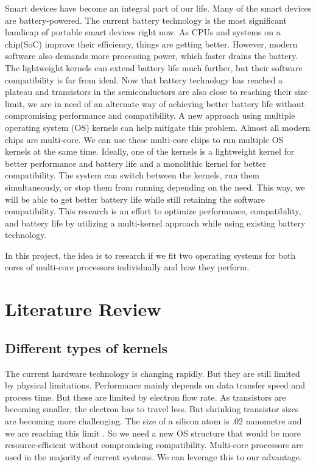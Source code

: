 \documentclass[11pt]{article}       %
\begin{document}
Smart devices have become an integral part of our life. Many of the smart devices are battery-powered. The current battery technology is the most significant handicap of portable smart devices right now. As CPUs and systems on a chip(SoC) improve their efficiency, things are getting better. However, modern software also demands more processing power, which faster drains the battery. The lightweight kernels can extend battery life much further, but their software compatibility is far from ideal. Now that battery technology has reached a plateau and transistors in the semiconductors are also close to reaching their size limit, we are in need of an alternate way of achieving better battery life without compromising performance and compatibility. A new approach using multiple operating system (OS) kernels can help mitigate this problem. Almost all modern chips are multi-core. We can use these multi-core chips to run multiple OS kernels at the same time. Ideally, one of the kernels is a lightweight kernel for better performance and battery life and a monolithic kernel for better compatibility. The system can switch between the kernels, run them simultaneously, or stop them from running depending on the need. This way, we will be able to get better battery life while still retaining the software compatibility. This research is an effort to optimize performance, compatibility, and battery life by utilizing a multi-kernel approach while using existing battery technology. 

In this project, the idea is to research if we fit two operating systems for both cores of multi-core processors individually and how they perform.

\section{Literature Review} \label{litrev}

\subsection{Different types of kernels}
The current hardware technology is changing rapidly. But they are still limited by physical limitations. Performance mainly depends on data transfer speed and process time. But these are limited by electron flow rate\cite{DEL17}. As transistors are becoming smaller, the electron has to travel less. But shrinking transistor sizes are becoming more challenging. The size of a silicon atom is .02 nanometre and we are reaching this limit \cite{DEL19}. So we need a new OS structure that would be more resource-efficient without compromising compatibility. Multi-core processors are used in the majority of current systems. We can leverage this to our advantage.\\
\end{document}
